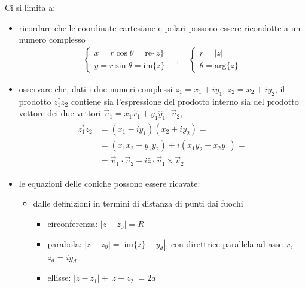 \documentclass[letterpaper,10pt,italian]{jupyterBook}
\begin{document}
\sphinxAtStartPar
Ci si limita a:
\begin{itemize}
\item {} 
\sphinxAtStartPar
ricordare che le coordinate cartesiane e polari possono essere ricondotte a un numero complesso
\begin{equation*}
\begin{split}
  \begin{cases} x = r \cos \theta = \text{re}\{z\} \\ y = r \sin \theta = \text{im}\{z\} \end{cases}
  \quad , \quad
  \begin{cases} r = |z|            \\ \theta = \text{arg}\{z\} \end{cases}
  \end{split}
\end{equation*}
\item {} 
\sphinxAtStartPar
osservare che, dati i due numeri complessi \(z_1 = x_1 + i y_1\), \(z_2 = x_2 + i y_2\), il prodotto \(z_1^* z_2\) contiene sia l’espressione del prodotto interno sia del prodotto vettore dei due vettori \(\vec{v}_1 = x_1 \hat{x}_1 + y_1 \hat{y}_1\), \(\vec{v}_2\),
\begin{equation*}
\begin{split}\begin{aligned}
    z_1^* z_2 & = (x_1 - i y_1) (x_2 + i y_2) = \\
              & = (x_1 x_2 + y_1 y_2) + i(x_1 y_2 - x_2 y_1) = \\
              & = \vec{v}_1 \cdot \vec{v}_2 + i \hat{z} \cdot \vec{v}_1 \times \vec{v}_2
  \end{aligned}\end{split}
\end{equation*}
\item {} 
\sphinxAtStartPar
le equazioni delle coniche possono essere ricavate:
\begin{itemize}
\item {} 
\sphinxAtStartPar
dalle definizioni in termini di distanza di punti dai fuochi
\begin{itemize}
\item {} 
\sphinxAtStartPar
circonferenza: \(|z-z_0| = R\)

\item {} 
\sphinxAtStartPar
parabola:      \(|z-z_0| = | \text{im}\{z\} - y_d|\), con direttrice parallela ad asse \(x\), \(z_d = i y_d\)

\item {} 
\sphinxAtStartPar
ellisse:       \(|z-z_1| + |z-z_2| = 2a\)


\end{itemize}
\end{itemize}
\end{itemize}
\end{document}

